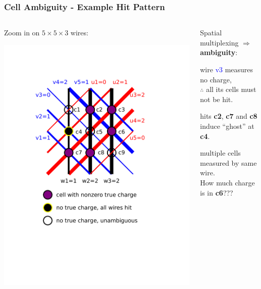 \documentclass[xcolor=dvipsnames]{beamer}
\begin{document}
\begin{frame}
  \frametitle{Cell Ambiguity - Example Hit Pattern}

  \begin{columns}
    \begin{column}{0.35\textwidth}
      \begin{center}
        \scriptsize Zoom in on $5 \times 5 \times 3$ wires:

        \includegraphics[width=\textwidth,trim=3.5cm 6cm 5cm 3cm,clip]{example-hit-cells.pdf}        

      \end{center}
    \end{column}
    \begin{column}{0.65\textwidth}

      Spatial multiplexing $\Rightarrow$ \textbf{ambiguity}:

      \vspace{5mm}

      \begin{description}\scriptsize
      \item[Good] wire \textcolor{blue}{v3} measures no charge, \\$\therefore$ all its cells must not be hit.
      \item[Bad] hits \textbf{c2}, \textbf{c7} and \textbf{c8} induce ``ghost'' at \textbf{c4}.
      \item[Ambiguous] multiple cells measured by same wire.\\
        How much charge is in \textbf{c6}???
      \end{description}


\end{column}
\end{columns}
\end{frame}
\end{document}
